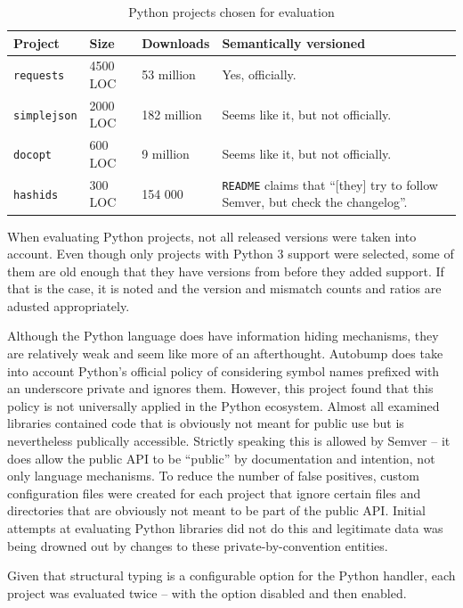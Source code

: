 \documentclass{l4proj}
\newcommand\genericstyle{\lstset{basicstyle=\ttm}}
\newcommand\codeinline[1]{{\genericstyle\lstinline!#1!}}
\begin{document}
\begin{table}[H]
\centering
\caption{Python projects chosen for evaluation}
\label{PythonProjectsForEvaluation}
\begin{tabular}{|l|l|l|p{10cm}|}
\hline
\textbf{Project} & \textbf{Size} & \textbf{Downloads} & \textbf{Semantically versioned} \\
\hline
\codeinline{requests} & 4500 LOC & 53 million & Yes, officially. \\
\codeinline{simplejson} & 2000 LOC & 182 million & Seems like it, but not officially. \\
\codeinline{docopt} & 600 LOC & 9 million & Seems like it, but not
officially. \\
\codeinline{hashids} & 300 LOC & 154 000 & \codeinline{README} claims
that ``[they] try to follow Semver, but check the changelog''. \\
\hline
\end{tabular}
\end{table}

When evaluating Python projects, not all released versions were taken
into account. Even though only projects with Python 3 support were
selected, some of them are old enough that they have versions from
before they added support. If that is the case, it is noted and the
version and mismatch counts and ratios are adusted appropriately.

Although the Python language does have information hiding mechanisms,
they are relatively weak and seem like more of an afterthought.
Autobump does take into account Python's official policy of
considering symbol names prefixed with an underscore private and
ignores them. However, this project found that this policy is not
universally applied in the Python ecosystem. Almost all examined
libraries contained code that is obviously not meant for public use
but is nevertheless publically accessible. Strictly speaking this is
allowed by Semver -- it does allow the public API to be ``public'' by
documentation and intention, not only language mechanisms. To reduce
the number of false positives, custom configuration files were created
for each project that ignore certain files and directories that are
obviously not meant to be part of the public API. Initial attempts at
evaluating Python libraries did not do this and legitimate data was
being drowned out by changes to these private-by-convention entities.

Given that structural typing is a configurable option for the Python
handler, each project was evaluated twice -- with the option disabled
and then enabled.
\end{document}
